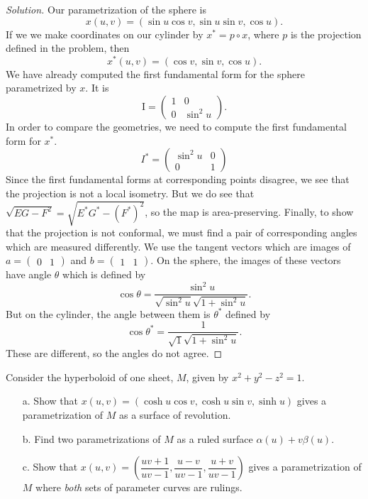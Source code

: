 \documentclass[Shifrin_Solutions_Spring_2015]{subfiles}
\begin{document}
\begin{proof}[Solution] Our parametrization of the sphere is
\[
x(u,v) = \left(\sin u \cos v , \sin u \sin v, \cos u \right).
\]
If we we make coordinates on our cylinder by $x^{\ast} = p\circ x$, where $p$ is the projection defined in the problem, then
\[
x^{\ast}(u,v) = \left( \cos v , \sin v, \cos u \right) .
\]
We have already computed the first fundamental form for the sphere parametrized by $x$. It is
\[
\mathrm{I} = \begin{pmatrix}
1 & 0 \\ 0 & \sin^2 u
\end{pmatrix}.
\]
In order to compare the geometries, we need to compute the first fundamental form for $x^{\ast}$.
\[
I^{\ast} = \begin{pmatrix}
\sin^2 u & 0 \\ 0 & 1
\end{pmatrix}
\]
Since the first fundamental forms at corresponding points disagree, we see that the projection is not a local isometry. But we do see that $\sqrt{EG-F^2} = \sqrt{E^{\ast}G^{\ast}-(F^{\ast})^2}$, so the map is area-preserving. Finally, to show that the projection is not conformal, we must find a pair of corresponding angles which are measured differently. We use the tangent vectors which are images of $a = \begin{pmatrix} 0 & 1\end{pmatrix}$ and $b= \begin{pmatrix} 1 & 1 \end{pmatrix}$. On the sphere, the images of these vectors have angle $\theta$ which is defined by
\[
\cos\theta = \dfrac{\sin^2 u}{\sqrt{\sin^2 u} \sqrt{1+\sin^2 u}}.
\]
But on the cylinder, the angle between them is $\theta^{\ast}$ defined by
\[
\cos\theta^{\ast} = \dfrac{1}{\sqrt{1}\sqrt{1+\sin^2 u}}.
\]
These are different, so the angles do not agree.
\end{proof}

\begin{exercise}
Consider the hyperboloid of one sheet, $M$, given by $x^2 +y^2-z^2 = 1$.
\begin{itemize}
\item[a.] Show that $x(u,v) = ( \cosh u \cos v , \cosh u \sin v , \sinh u )$ gives a parametrization of $M$ as a surface of revolution.

\item[b.] Find two parametrizations of $M$ as a ruled surface $\alpha(u) + v \beta(u)$.

\item[c.] Show that $x(u,v) = \left( \dfrac{uv+1}{uv-1}, \dfrac{u-v}{uv-1}, \dfrac{u+v}{uv-1} \right)$ gives a parametrization of $M$ where \emph{both} sets of parameter curves are rulings.
\end{itemize}
\end{exercise}
\end{document}
